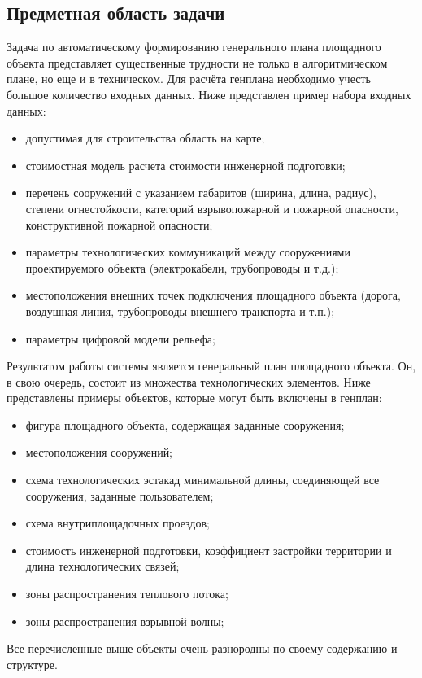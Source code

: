 \subsection{\large{Предметная область задачи}}

Задача по автоматическому формированию генерального плана площадного объекта
представляет существенные трудности не только в алгоритмическом плане, но еще и в техническом.
Для расчёта генплана необходимо учесть большое количество входных данных.
Ниже представлен пример набора входных данных:
\begin{itemize}
    \item допустимая для строительства область на карте;
    \item стоимостная модель расчета стоимости инженерной подготовки;
    \item перечень сооружений с указанием габаритов (ширина, длина, радиус),
    степени огнестойкости, категорий взрывопожарной и пожарной опасности, конструктивной пожарной опасности;
    \item параметры технологических коммуникаций между сооружениями проектируемого объекта (электрокабели, трубопроводы и т.д.);
    \item местоположения внешних точек подключения площадного объекта
    (дорога, воздушная линия, трубопроводы внешнего транспорта и т.п.);
    \item параметры цифровой модели рельефа;
\end{itemize}

Результатом работы системы является генеральный план площадного объекта.
Он, в свою очередь, состоит из множества технологических элементов.
Ниже представлены примеры объектов, которые могут быть включены в генплан:
\begin{itemize}
    \item фигура площадного объекта, содержащая заданные сооружения;
    \item местоположения сооружений;
    \item схема технологических эстакад минимальной длины, соединяющей все сооружения, заданные пользователем;
    \item схема внутриплощадочных проездов;
    \item стоимость инженерной подготовки, коэффициент застройки территории и длина технологических связей;
    \item зоны распространения теплового потока;
    \item зоны распространения взрывной волны;
\end{itemize}

Все перечисленные выше объекты очень разнородны по своему содержанию и структуре.